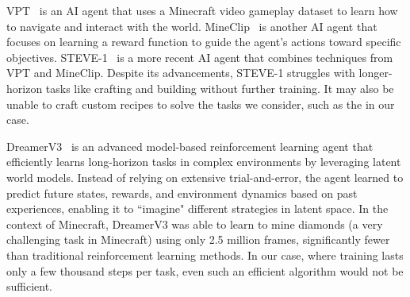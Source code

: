 VPT~\citep{baker2022video} is an AI \mcraft agent that uses a Minecraft video gameplay dataset to learn how to navigate and interact with the world. 
MineClip~\citep{fan2022minedojo} is another AI \mcraft agent that focuses on learning a reward function to guide the agent's actions toward specific objectives. 
STEVE-1~\citep{lifshitz2024steve} is a more recent AI \mcraft agent that combines techniques from VPT and MineClip. 
Despite its advancements, STEVE-1 struggles with longer-horizon tasks like crafting and building without further training. It may also be unable to craft custom recipes to solve the \mcraft tasks we consider, such as the \pogotask in our case. 

DreamerV3~\citep{dreamerv3} is an advanced model-based reinforcement learning agent that efficiently learns long-horizon tasks in complex environments by leveraging latent world models. Instead of relying on extensive trial-and-error, the agent learned to predict future states, rewards, and environment dynamics based on past experiences, enabling it to ``imagine" different strategies in latent space. In the context of Minecraft, DreamerV3 was able to learn to mine diamonds (a very challenging task in Minecraft) using only 2.5 million frames, significantly fewer than traditional reinforcement learning methods.
In our case, where training lasts only a few thousand steps per task, even such an efficient algorithm would not be sufficient.